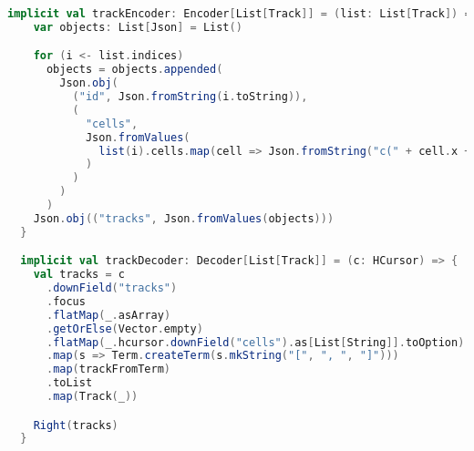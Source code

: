 \begin{lstlisting}[language=Scala, caption=Impliciti per le operazioni di codifica, label=code:coder]
implicit val trackEncoder: Encoder[List[Track]] = (list: List[Track]) => {
    var objects: List[Json] = List()

    for (i <- list.indices)
      objects = objects.appended(
        Json.obj(
          ("id", Json.fromString(i.toString)),
          (
            "cells",
            Json.fromValues(
              list(i).cells.map(cell => Json.fromString("c(" + cell.x + ", " + cell.y + ")"))
            )
          )
        )
      )
    Json.obj(("tracks", Json.fromValues(objects)))
  }

  implicit val trackDecoder: Decoder[List[Track]] = (c: HCursor) => {
    val tracks = c
      .downField("tracks")
      .focus
      .flatMap(_.asArray)
      .getOrElse(Vector.empty)
      .flatMap(_.hcursor.downField("cells").as[List[String]].toOption)
      .map(s => Term.createTerm(s.mkString("[", ", ", "]")))
      .map(trackFromTerm)
      .toList
      .map(Track(_))

    Right(tracks)
  }
\end{lstlisting}
